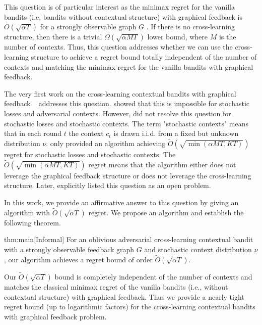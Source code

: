 This question is of particular interest as the minimax regret for the vanilla bandits (i.e, bandits without contextual structure) with graphical feedback is $\widetilde{O}(\sqrt{\alpha T})$ for a strongly observable graph $G$ \citep{GraphAlon15}. 
%
If there is no cross-learning structure, then there is a trivial $\Omega(\sqrt{\alpha MT})$ lower bound, where $M$ is the number of  contexts.
Thus, this question addresses whether we can use the cross-learning structure to achieve a regret bound totally independent of the number of contexts and matching the minimax regret for the vanilla bandits with graphical feedback.
%

The very first work on the cross-learning contextual bandits with graphical feedback ~\citep{Han24} addresses  this question. 
%
\citet{Han24} showed that this is impossible for stochastic losses and adversarial contexts. 
%
However, \citet{Han24} did not resolve this question for stochastic losses and stochastic contexts. The term "stochastic contexts" means that in each round $t$ the context $c_t$ is drawn i.i.d. from a fixed but unknown distribution $\nu$.
%
\citet{Han24}  only provided an algorithm achieving $\widetilde{O}(\sqrt{\min(\alpha MT,KT)})$ regret for stochastic losses and stochastic contexts. The $\widetilde{O}(\sqrt{\min(\alpha MT,KT)})$ regret means that the  algorithm either does not leverage the graphical feedback structure or does not leverage the cross-learning structure.
%
Later, \citet{MAS24} explicitly listed this question as an open problem. 

In this work, we provide an affirmative answer to this question by giving an algorithm with $\widetilde{O}(\sqrt{\alpha T})$ regret. We propose an algorithm and establish the following theorem.

\begin{reptheorem}{thm:main}[Informal]
    For an oblivious adversarial cross-learning contextual bandit  with a strongly observable feedback graph $G$ and stochastic context distribution $\nu$,  our algorithm achieves a regret bound of order $\widetilde{O}(\sqrt{\alpha T})$.
\end{reptheorem}

Our $\widetilde{O}(\sqrt{\alpha T})$ bound is completely independent of the number of contexts and matches the classical minimax regret of the vanilla bandits (i.e., without contextual structure) with graphical feedback\citep{GraphAlon15}. Thus we provide a nearly tight regret bound (up to logarithmic factors)  for the  cross-learning contextual bandits with graphical feedback problem. 
%

